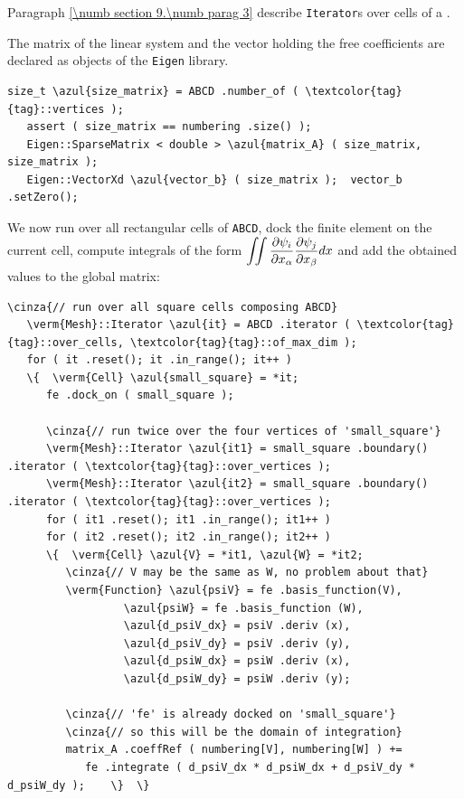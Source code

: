Paragraph \ref{\numb section 9.\numb parag 3} describe {\small\tt Iterator}s over
cells of a {\small\tt{}}.

The matrix of the linear system and the vector holding the free coefficients
are declared as objects of the {\small\tt Eigen} library.

\begin{Verbatim}[commandchars=\\\{\},formatcom=\small\tt,frame=single,
   label=parag-\ref{\numb section 6.\numb parag 2}.cpp,rulecolor=\color{moldura},
   baselinestretch=0.94,framesep=2mm                                            ]
   size_t \azul{size_matrix} = ABCD .number_of ( \textcolor{tag}{tag}::vertices );
   assert ( size_matrix == numbering .size() );
   Eigen::SparseMatrix < double > \azul{matrix_A} ( size_matrix, size_matrix );
   Eigen::VectorXd \azul{vector_b} ( size_matrix );  vector_b .setZero();
\end{Verbatim}

We now run over all rectangular cells of {\small\tt ABCD}, dock the finite element
on the current cell,
compute integrals of the form $ \displaystyle \int\!\!\!\int {\partial \psi_i \over
\partial x_\alpha} {\partial \psi_j \over \partial x_\beta} dx $ and add the obtained
values to the global matrix:

\begin{Verbatim}[commandchars=\\\{\},formatcom=\small\tt,frame=single,
   label=parag-\ref{\numb section 6.\numb parag 2}.cpp,rulecolor=\color{moldura},
   baselinestretch=0.94,framesep=2mm                                            ]
   \cinza{// run over all square cells composing ABCD}
   \verm{Mesh}::Iterator \azul{it} = ABCD .iterator ( \textcolor{tag}{tag}::over_cells, \textcolor{tag}{tag}::of_max_dim );
   for ( it .reset(); it .in_range(); it++ )
   \{  \verm{Cell} \azul{small_square} = *it;
      fe .dock_on ( small_square );

      \cinza{// run twice over the four vertices of 'small_square'}
      \verm{Mesh}::Iterator \azul{it1} = small_square .boundary() .iterator ( \textcolor{tag}{tag}::over_vertices );
      \verm{Mesh}::Iterator \azul{it2} = small_square .boundary() .iterator ( \textcolor{tag}{tag}::over_vertices );
      for ( it1 .reset(); it1 .in_range(); it1++ )
      for ( it2 .reset(); it2 .in_range(); it2++ )
      \{  \verm{Cell} \azul{V} = *it1, \azul{W} = *it2;
         \cinza{// V may be the same as W, no problem about that}
         \verm{Function} \azul{psiV} = fe .basis_function(V),
                  \azul{psiW} = fe .basis_function (W),
                  \azul{d_psiV_dx} = psiV .deriv (x),
                  \azul{d_psiV_dy} = psiV .deriv (y),
                  \azul{d_psiW_dx} = psiW .deriv (x),
                  \azul{d_psiW_dy} = psiW .deriv (y);
                  
         \cinza{// 'fe' is already docked on 'small_square'}
         \cinza{// so this will be the domain of integration}
         matrix_A .coeffRef ( numbering[V], numbering[W] ) +=
            fe .integrate ( d_psiV_dx * d_psiW_dx + d_psiV_dy * d_psiW_dy );    \}  \}
\end{Verbatim}

